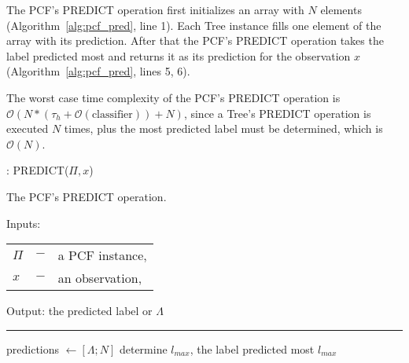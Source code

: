 The PCF's PREDICT operation first initializes an array with
$N$ elements (Algorithm~\ref{alg:pcf_pred}, line 1). Each
Tree instance fills one element of the array with its
prediction. After that the PCF's PREDICT operation takes
the label predicted most and returns it as its prediction
for the observation $x$ (Algorithm~\ref{alg:pcf_pred},
lines 5, 6).

The worst case time complexity of the PCF's PREDICT
operation is $\mathcal{O}(N * (\tau_h + \mathcal{O}
(\text{classifier})) + N)$, since a Tree's PREDICT operation
is executed $N$ times, plus the most predicted label
must be determined, which is $\mathcal{O}(N)$.

\begin{algorithm}
  \caption{: PREDICT($\Pi, x$)}
  \label{alg:pcf_pred}
  The PCF's PREDICT operation.

  Inputs:

    \begin{tabu}{llX}
    $\Pi$ &$-$ &a PCF instance,\\
    $x$ &$-$ &an observation, \\
    \end{tabu}

  Output: the predicted label or $\Lambda$

  \noindent\rule{\linewidth}{0.4pt}

  \begin{algorithmic}[1]
    \STATE predictions $\leftarrow [\Lambda; N]$
    \ENDFOR
    \STATE determine $l_{max}$, the label predicted most
    \RETURN $l_{max}$
  \end{algorithmic}
\end{algorithm}
